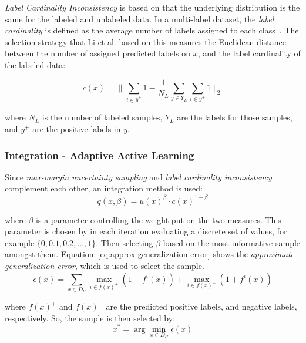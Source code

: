 \textit{Label Cardinality Inconsistency} is based on that the underlying distribution is the same for the labeled and unlabeled data.
In a multi-label dataset, the \textit{label cardinality} is defined as the average number of labels assigned to each class~\cite{tsoumakas2006multi}.
The selection strategy that Li et al\@. based on this measures the Euclidean distance between the number of assigned predicted labels on $x$, and the label cardinality of the labeled data:

\begin{equation}
    c(x) = \bigg \lVert \sum_{i \in \hat{y}^+} 1 - \frac{1}{N_L} \sum_{y \in Y_L} \sum_{i \in y^+} 1 \bigg \rVert_2
\end{equation}

where $N_L$ is the number of labeled samples, $Y_L$ are the labels for those samples, and $y^+$ are the positive labels in $y$.

\subsubsection{Integration - Adaptive Active Learning}

Since \textit{max-margin uncertainty sampling} and \textit{label cardinality inconsistency} complement each other, an integration method is used:
\begin{equation}\label{eq:approx-generalization-error}
    q(x, \beta) = u(x)^\beta \cdot c(x)^{1-\beta}
\end{equation}

where $\beta$ is a parameter controlling the weight put on the two measures.
This parameter is chosen by in each iteration evaluating a discrete set of values, for example $\{0, 0.1, 0.2, \dots, 1\}$.
Then selecting $\beta$ based on the most informative sample amongst them.
Equation~\ref{eq:approx-generalization-error} shows the \textit{approximate generalization error}, which is used to select the sample.
\begin{equation}\label{eq:calc-epsilon}
    \epsilon(x) = \sum_{x \in D_U} \max_{i \in f(x)^+}(1-f^i(x)) + \max_{i \in f(x)^-}(1+f^i(x))
\end{equation}

where $f(x)^+$ and $f(x)^-$ are the predicted positive labels, and negative labels, respectively.
So, the sample is then selected by:
\begin{equation}\label{eq:x-star}
    x^* = \arg \min_{x \in D_U} \epsilon(x)
\end{equation}

